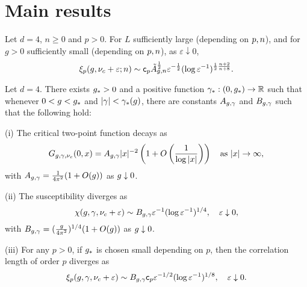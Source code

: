 \section{Main results}

\begin{theorem}\label{thm:mr}
Let $d=4$, $n \geq 0$ and $p>0$.
For $L$ sufficiently large (depending on $p,n$), and for
$g >0$ sufficiently small (depending on $p,n$),
as $\varepsilon \downarrow 0$,
\begin{equation}
\lbeq{xipasy}
\xi_\clo(g, \nu_c  + \varepsilon;n)
\sim {\sf c}_p \tilde A_{g,n}^{\frac12}  \varepsilon^{-\frac{1}{2}} (\log \varepsilon^{-1})^{\frac{1}{2}\frac{n+2}{n+8}}
.
\end{equation}
\end{theorem}

\begin{theorem} \label{thm:suscept}
  Let $d = 4$.
  There exists $g_* > 0$
  and a positive function $\gamma_* : (0, g_*) \rightarrow {\mathbb R}$
  such that whenever $0 < g < g_*$ and $|\gamma| < \gamma_*(g)$,
  there are constants $A_{g,\gamma}$ and $B_{g,\gamma}$ such that the following hold:

  \smallskip\noindent
  (i)
  The critical two-point function decays as
  \begin{equation}
    G_{g,\gamma,\nu_c}(0, x)
        =
    A_{g,\gamma} |x|^{-2} \left(1 + O\left(\frac{1}{\log |x|}\right)\right)
        \quad
    \text{as $|x|\rightarrow\infty$},
  \end{equation}
  with $A_{g,\gamma} = \frac{1}{4 \pi^2} (1 + O(g))$ as $g \downarrow 0$.

  \smallskip\noindent
  (ii)
  The susceptibility diverges as
  \begin{equation} \label{e:chieps-asympt}
    \chi(g, \gamma, \nu_c + \varepsilon)
    \sim B_{g,\gamma} \varepsilon^{-1} (\log \varepsilon^{-1})^{1/4},
    \quad \varepsilon\downarrow 0,
  \end{equation}
  with $B_{g,\gamma} = (\frac{g}{4 \pi^2})^{1/4} (1 + O(g))$ as $g \downarrow 0$.

  \smallskip\noindent
  (iii) For any $p >0$,
  if $g_*$ is chosen small depending on $p$, then
  the correlation length of order $p$ diverges as
  \begin{equation} \label{e:xieps-asympt}
    \xi_p(g, \gamma, \nu_c + \varepsilon)
     \sim B_{g,\gamma} {\sf c}_p \varepsilon^{-1/2} (\log \varepsilon^{-1})^{1/8},
     \quad \varepsilon\downarrow 0.
  \end{equation}
\end{theorem}